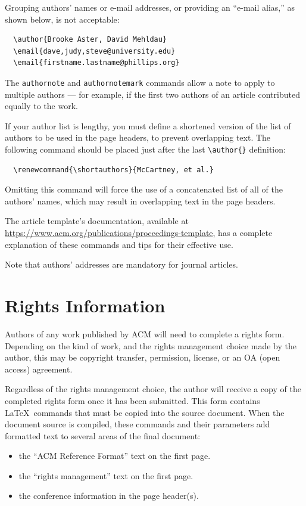 Grouping authors' names or e-mail addresses, or providing an ``e-mail
alias,'' as shown below, is not acceptable:
\begin{verbatim}
  \author{Brooke Aster, David Mehldau}
  \email{dave,judy,steve@university.edu}
  \email{firstname.lastname@phillips.org}
\end{verbatim}

The \verb|authornote| and \verb|authornotemark| commands allow a note
to apply to multiple authors --- for example, if the first two authors
of an article contributed equally to the work.

If your author list is lengthy, you must define a shortened version of
the list of authors to be used in the page headers, to prevent
overlapping text. The following command should be placed just after
the last \verb|\author{}| definition:
\begin{verbatim}
  \renewcommand{\shortauthors}{McCartney, et al.}
\end{verbatim}
Omitting this command will force the use of a concatenated list of all
of the authors' names, which may result in overlapping text in the
page headers.

The article template's documentation, available at
\url{https://www.acm.org/publications/proceedings-template}, has a
complete explanation of these commands and tips for their effective
use.

Note that authors' addresses are mandatory for journal articles.

\section{Rights Information}

Authors of any work published by ACM will need to complete a rights
form. Depending on the kind of work, and the rights management choice
made by the author, this may be copyright transfer, permission,
license, or an OA (open access) agreement.

Regardless of the rights management choice, the author will receive a
copy of the completed rights form once it has been submitted. This
form contains \LaTeX\ commands that must be copied into the source
document. When the document source is compiled, these commands and
their parameters add formatted text to several areas of the final
document:
\begin{itemize}
\item the ``ACM Reference Format'' text on the first page.
\item the ``rights management'' text on the first page.
\item the conference information in the page header(s).
\end{itemize}

